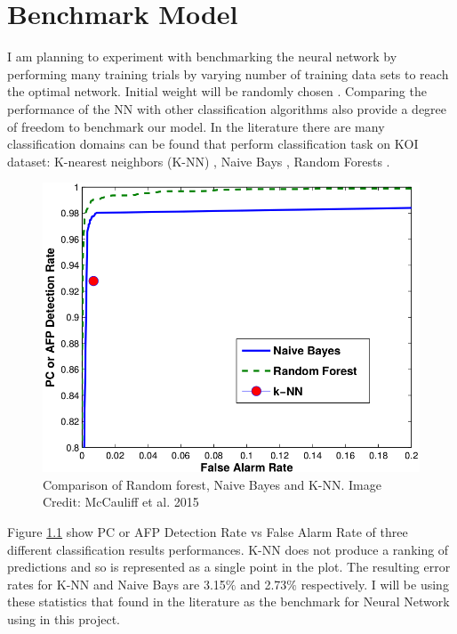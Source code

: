 \chapter{Benchmark Model}

I am planning to experiment with benchmarking the neural network by performing many training trials by varying number of training data sets to reach the optimal network. Initial weight will be randomly chosen \cite{hamey1991benchmarking}. Comparing the performance of the NN with other classification algorithms also provide a degree of freedom to benchmark our model. In the literature there are many classification domains can be found that perform classification task on KOI dataset: K-nearest neighbors (K-NN) \cite{2011MNRAS.414.2602D}, Naive Bays \cite{feigelson2012}, Random Forests \cite{2015ApJ...806....6M}.

\begin{figure}[!h]
\begin{center}
        \includegraphics[width=0.35\textheight]{img/benchmark.png}
        \caption{Comparison of Random forest, Naive Bayes and K-NN. Image Credit: McCauliff et al. 2015 \cite{2015ApJ...806....6M}}  \label{fig:benchmark}
\end{center}
\end{figure}

Figure \ref{fig:benchmark} show PC or AFP Detection Rate vs False Alarm Rate of three different classification results performances. K-NN does not produce a ranking of predictions and so is represented as a single point in the plot. The resulting error rates for K-NN and Naive Bays are 3.15$\%$ and 2.73$\%$ respectively. I will be using these statistics that found in the literature as the benchmark for Neural Network using in this project.
